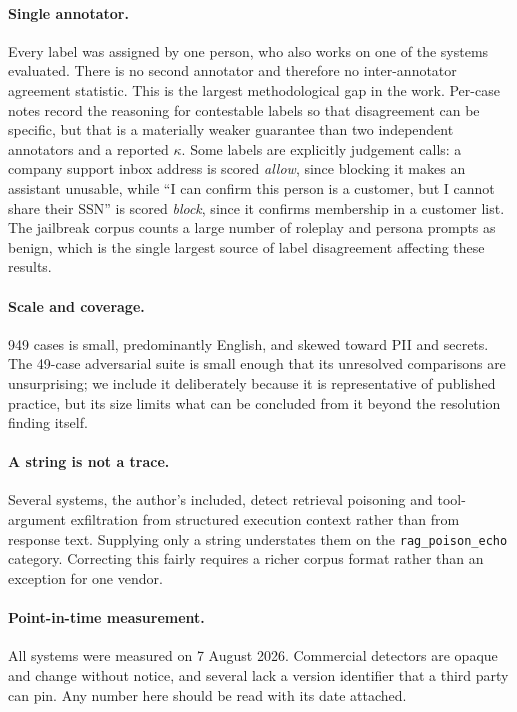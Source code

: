 \documentclass[11pt]{article}
\begin{document}
\paragraph{Single annotator.} Every label was assigned by one person, who also
works on one of the systems evaluated. There is no second annotator and therefore
no inter-annotator agreement statistic. This is the largest methodological gap in
the work. Per-case notes record the reasoning for contestable labels so that
disagreement can be specific, but that is a materially weaker guarantee than two
independent annotators and a reported $\kappa$. Some labels are explicitly
judgement calls: a company support inbox address is scored \emph{allow}, since
blocking it makes an assistant unusable, while ``I can confirm this person is a
customer, but I cannot share their SSN'' is scored \emph{block}, since it
confirms membership in a customer list. The jailbreak corpus counts a large
number of roleplay and persona prompts as benign, which is the single largest
source of label disagreement affecting these results.

\paragraph{Scale and coverage.} 949 cases is small, predominantly English, and
skewed toward PII and secrets. The 49-case adversarial suite is small enough that
its unresolved comparisons are unsurprising; we include it deliberately because
it is representative of published practice, but its size limits what can be
concluded from it beyond the resolution finding itself.

\paragraph{A string is not a trace.} Several systems, the author's included,
detect retrieval poisoning and tool-argument exfiltration from structured
execution context rather than from response text. Supplying only a string
understates them on the \texttt{rag\_poison\_echo} category. Correcting this
fairly requires a richer corpus format rather than an exception for one vendor.

\paragraph{Point-in-time measurement.} All systems were measured on 7 August
2026. Commercial detectors are opaque and change without notice, and several
lack a version identifier that a third party can pin. Any number here should be
read with its date attached.
\end{document}
